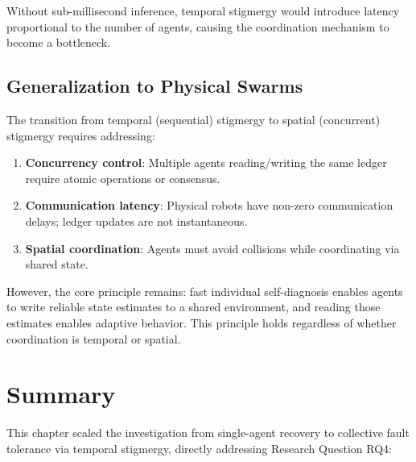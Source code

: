 \documentclass[12pt,a4paper,oneside]{report}
\begin{document}
Without sub-millisecond inference, temporal stigmergy would introduce latency proportional to the number of agents, causing the coordination mechanism to become a bottleneck.

\subsection{Generalization to Physical Swarms}

The transition from temporal (sequential) stigmergy to spatial (concurrent) stigmergy requires addressing:
\begin{enumerate}
    \item \textbf{Concurrency control}: Multiple agents reading/writing the same ledger require atomic operations or consensus.
    \item \textbf{Communication latency}: Physical robots have non-zero communication delays; ledger updates are not instantaneous.
    \item \textbf{Spatial coordination}: Agents must avoid collisions while coordinating via shared state.
\end{enumerate}

However, the core principle remains: fast individual self-diagnosis enables agents to write reliable state estimates to a shared environment, and reading those estimates enables adaptive behavior. This principle holds regardless of whether coordination is temporal or spatial.

\section{Summary}

This chapter scaled the investigation from single-agent recovery to collective fault tolerance via temporal stigmergy, directly addressing Research Question RQ4:
\end{document}
